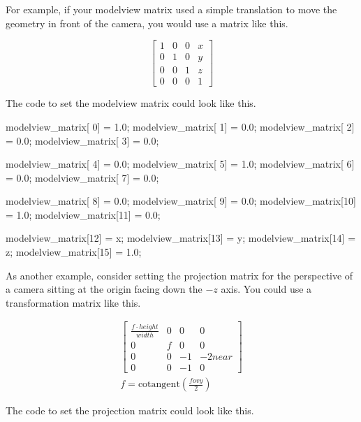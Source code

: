 For example, if your modelview matrix used a simple translation to move the
geometry in front of the camera, you would use a matrix like this.

\begin{displaymath}
  \left[
    \begin{array}{cccc}
      1 & 0 & 0 & x \\
      0 & 1 & 0 & y \\
      0 & 0 & 1 & z \\
      0 & 0 & 0 & 1
    \end{array}
  \right]
\end{displaymath}

The code to set the modelview matrix could look like this.

\begin{code}
modelview_matrix[ 0] = 1.0;
modelview_matrix[ 1] = 0.0;
modelview_matrix[ 2] = 0.0;
modelview_matrix[ 3] = 0.0;

modelview_matrix[ 4] = 0.0;
modelview_matrix[ 5] = 1.0;
modelview_matrix[ 6] = 0.0;
modelview_matrix[ 7] = 0.0;

modelview_matrix[ 8] = 0.0;
modelview_matrix[ 9] = 0.0;
modelview_matrix[10] = 1.0;
modelview_matrix[11] = 0.0;

modelview_matrix[12] = x;
modelview_matrix[13] = y;
modelview_matrix[14] = z;
modelview_matrix[15] = 1.0;
\end{code}

As another example, consider setting the projection matrix for the
perspective of a camera sitting at the origin facing down the $-z$ axis.
You could use a transformation matrix like this.

\begin{displaymath}
  \begin{array}{c}
    \left[
      \begin{array}{cccc}
        \frac{f \cdot height}{width} & 0 & 0 & 0 \\
        0 & f & 0 & 0 \\
        0 & 0 & -1 & -2near \\
        0 & 0 & -1 & 0
      \end{array}
    \right] \\
    f = \mathrm{cotangent}\left(\frac{fovy}{2}\right)
  \end{array}
\end{displaymath}

The code to set the projection matrix could look like this.

